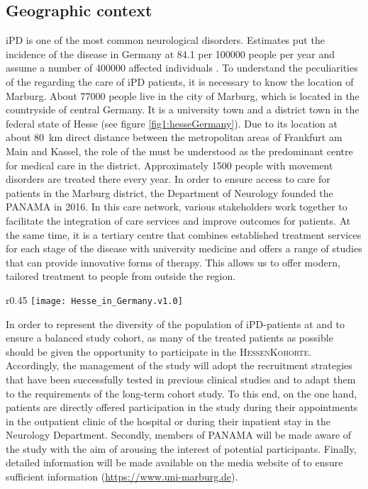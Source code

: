 \subsection{Geographic context}
\acl{iPD} is one of the most common neurological disorders. Estimates put the incidence of the disease in Germany at \SI[round-precision = 1]{84.1}{} per \num[round-precision = 0, round-mode = places]{100000}{} people per year and assume a number of \num[round-precision = 0, round-mode = places]{400000}{} affected individuals \citep{nerius2017parkinson}. To understand the peculiarities of the \UKM regarding the care of \ac{iPD} patients, it is necessary to know the location of Marburg. About \SI[round-precision = 0, round-mode=places]{77000}{} people live in the city of Marburg, which is located in the countryside of central Germany. It is a university town and a district town in the federal state of Hesse (see figure \ref{fig1:hesseGermany}). Due to its location at about \SI{80}{\km} direct distance between the metropolitan areas of Frankfurt am Main and Kassel, the role of the \UKM must be understood as the predominant centre for medical care in the district. Approximately \num[round-precision = 0, round-mode = places]{1500}{} people with movement disorders are treated there every year. In order to ensure access to care for patients in the Marburg district, the Department of Neurology founded the \ac{PANAMA} in 2016. In this care network, various stakeholders work together to facilitate the integration of care services and improve outcomes for patients. At the same time, it is a tertiary centre that combines established treatment services for each stage of the disease with university medicine and offers a range of studies that can provide innovative forms of therapy. This allows us to offer modern, tailored treatment to people from outside the region.

\begin{wrapfigure}{r}{0.45\textwidth}
    \label{fig1:hesseGermany}
    \centering
    \texttt{[image: Hesse\_in\_Germany.v1.0]}
    \caption{Location of Hesse in the German Federal Republic}
\end{wrapfigure}

In order to represent the diversity of the population of \ac{iPD}-patients at \UKM and to ensure a balanced study cohort, as many of the treated patients as possible should be given the opportunity to participate in the \textsc{HessenKohorte}. Accordingly, the management of the study will adopt the recruitment strategies that have been successfully tested in previous clinical studies and to adapt them to the requirements of the long-term cohort study. To this end, on the one hand, patients are directly offered participation in the study during their appointments in the outpatient clinic of the hospital or during their inpatient stay in the Neurology Department. Secondly, members of \ac{PANAMA} will be made aware of the study with the aim of arousing the interest of potential participants. Finally, detailed information will be made available on the media website of \UKM to ensure sufficient information (\url{https://www.uni-marburg.de}).
\newpage

